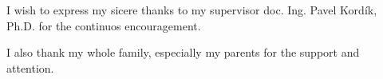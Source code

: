I wish to express my sicere thanks to my supervisor doc. Ing. Pavel Kordík, Ph.D. for the continuos encouragement.

I also thank my whole family, especially my parents for the support and attention.
